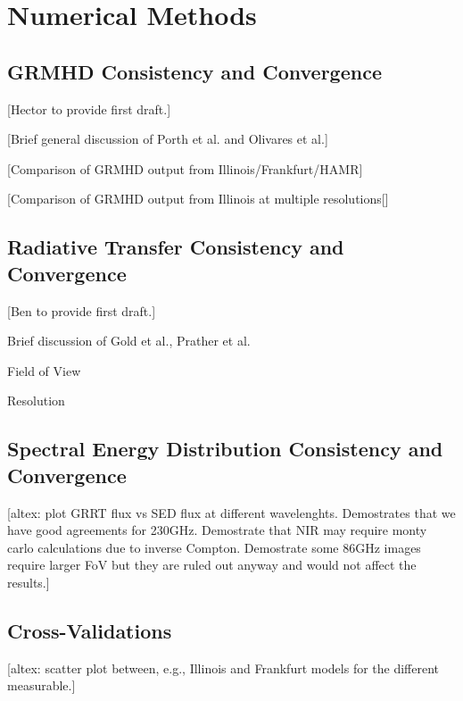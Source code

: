 \section{Numerical Methods}\label{app:numerical}

\subsection{GRMHD Consistency and Convergence}\label{app:resolution_study}

[Hector to provide first draft.]

[Brief general discussion of Porth et al. and Olivares et al.]

[Comparison of GRMHD output from Illinois/Frankfurt/HAMR]

[Comparison of GRMHD output from Illinois at multiple resolutions[]

\subsection{Radiative Transfer Consistency and Convergence}
\label{app:radtrans}

[Ben to provide first draft.]

Brief discussion of Gold et al., Prather et al.

Field of View

Resolution

\subsection{Spectral Energy Distribution Consistency and Convergence}

\begin{figure*}
    \centering
    [altex: plot GRRT flux vs SED flux at different wavelenghts.  Demostrates that we have good agreements for 230GHz.  Demostrate that NIR may require monty carlo calculations due to inverse Compton.  Demostrate some 86GHz images require larger FoV but they are ruled out anyway and would not affect the results.]
    \caption{Comparing GRRT flux from monte carlo calculations.  The three columns are 86GHz, 230GHz, and NIR, respectively.  GRRT is only used to spot check x-ray and does not have a corresponding scatter plot.}
    \label{fig:sed_vv}
\end{figure*}

\subsection{Cross-Validations}

\begin{figure*}
    \centering
    [altex: scatter plot between, e.g., Illinois and Frankfurt models for the different measurable.]
    \caption{Comparing model predictions from different modeling pipelines.  ...}
    \label{fig:xv}
\end{figure*}